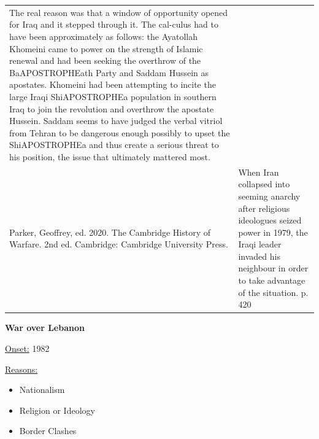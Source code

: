 {\begin{longtable}{p{}p{}}
The real reason was that a window of opportunity opened for Iraq and it stepped through it. The cal-culus had to have been approximately as follows: the Ayatollah Khomeini came to power on the strength of Islamic renewal and had been seeking the overthrow of the BaAPOSTROPHEath Party and Saddam Hussein as apostates. Khomeini had been attempting to incite the large Iraqi ShiAPOSTROPHEa population in southern Iraq to join the revolution and overthrow the apostate Hussein. Saddam seems to have judged the verbal vitriol from Tehran to be dangerous enough possibly to upset the ShiAPOSTROPHEa and thus create a serious threat to his position, the issue that ultimately mattered most.
\\
Parker, Geoffrey, ed. 2020. The Cambridge History of Warfare. 2nd ed. Cambridge: Cambridge University Press. & When Iran collapsed into seeming anarchy after religious ideologues seized power in 1979, the Iraqi leader invaded his neighbour in order to take advantage of the situation. p. 420
\\
\end{longtable}}
\clearpage
         \textbf{War over Lebanon} 

          \underline{Onset:} 1982         

\underline{Reasons:}
\begin{itemize}
\item Nationalism
\item Religion or Ideology
\item Border Clashes
\end{itemize}

